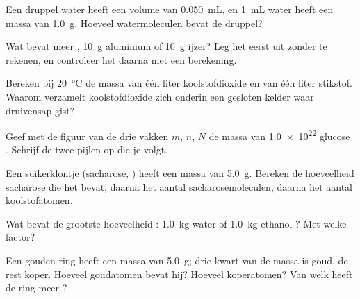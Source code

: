 \begin{exercise}[$\star\star$]\label{exo:g10:the-mole:6}
Een druppel water heeft een volume van \qty{0.050}{mL}, en \qty{1}{mL}
water heeft een massa van \qty{1.0}{g}. Hoeveel watermoleculen bevat de
druppel?
\end{exercise}

\begin{exercise}[$\star\star$]\label{exo:g10:the-mole:7}
Wat bevat meer , \qty{10}{g} aluminium of \qty{10}{g} ijzer? Leg
het eerst uit zonder te rekenen, en controleer het daarna met een
berekening.
\end{exercise}

\begin{exercise}[$\star\star$]\label{exo:g10:the-mole:8}
Bereken bij \qty{20}{\celsius} de massa van één liter koolstofdioxide en
van één liter stikstof. Waarom verzamelt koolstofdioxide zich onderin
een gesloten kelder waar druivensap gist?
\end{exercise}

\begin{exercise}[$\star\star$]\label{exo:g10:the-mole:9}
Geef met de figuur van de drie vakken $m$, $n$, $N$ de massa van
\num{1.0e22}  glucose . Schrijf de twee pijlen op
die je volgt.
\end{exercise}

\begin{exercise}[$\star\star$]\label{exo:g10:the-mole:10}
Een suikerklontje (sacharose, ) heeft een massa van
\qty{5.0}{g}. Bereken de hoeveelheid sacharose die het bevat, daarna het
aantal sacharosemoleculen, daarna het aantal koolstofatomen.
\end{exercise}

\begin{exercise}[$\star\star$]\label{exo:g10:the-mole:11}
Wat bevat de grootste hoeveelheid : \qty{1.0}{kg} water
 of \qty{1.0}{kg} ethanol ? Met welke factor?
\end{exercise}

\begin{exercise}[$\star\star\star$]\label{exo:g10:the-mole:12}
Een gouden ring heeft een massa van \qty{5.0}{g}; drie kwart van de massa
is goud, de rest koper. Hoeveel goudatomen bevat hij? Hoeveel
koperatomen? Van welk  heeft de ring meer ?
\end{exercise}

